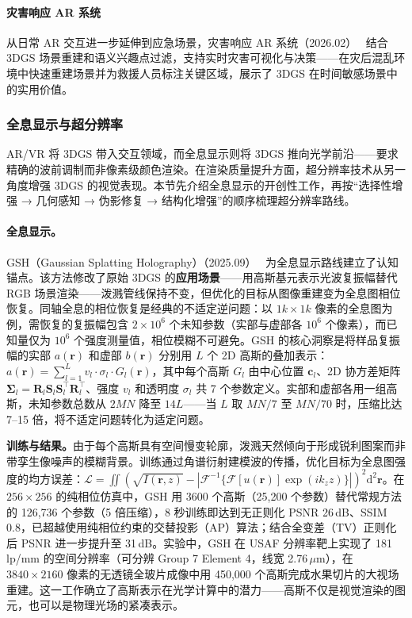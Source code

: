 \paragraph{灾害响应 AR 系统}
从日常 AR 交互进一步延伸到应急场景，灾害响应 AR 系统（2026.02）~\cite{2602_21874} 结合 3DGS 场景重建和语义兴趣点过滤，支持实时灾害可视化与决策——在灾后混乱环境中快速重建场景并为救援人员标注关键区域，展示了 3DGS 在时间敏感场景中的实用价值。

\subsubsection{全息显示与超分辨率}

AR/VR 将 3DGS 带入交互领域，而全息显示则将 3DGS 推向光学前沿——要求精确的波前调制而非像素级颜色渲染。在渲染质量提升方面，超分辨率技术从另一角度增强 3DGS 的视觉表现。本节先介绍全息显示的开创性工作，再按“选择性增强 → 几何感知 → 伪影修复 → 结构化增强”的顺序梳理超分辨率路线。

\paragraph{全息显示。}

GSH（Gaussian Splatting Holography）（2025.09）~\cite{2509_20774} 为全息显示路线建立了认知锚点。该方法修改了原始 3DGS 的\textbf{应用场景}——用高斯基元表示光波复振幅替代 RGB 场景渲染——泼溅管线保持不变，但优化的目标从图像重建变为全息图相位恢复。同轴全息的相位恢复是经典的不适定逆问题：以 $1k \times 1k$ 像素的全息图为例，需恢复的复振幅包含 $2 \times 10^6$ 个未知参数（实部与虚部各 $10^6$ 个像素），而已知量仅为 $10^6$ 个强度测量值，相位模糊不可避免。GSH 的核心洞察是将样品复振幅的实部 $a(\mathbf{r})$ 和虚部 $b(\mathbf{r})$ 分别用 $L$ 个 2D 高斯的叠加表示：$a(\mathbf{r}) = \sum_{l=1}^{L} v_l \cdot \sigma_l \cdot G_l(\mathbf{r})$，其中每个高斯 $G_l$ 由中心位置 $\mathbf{c}_l$、2D 协方差矩阵 $\bm{\Sigma}_l = \mathbf{R}_l \mathbf{S}_l \mathbf{S}_l^\top \mathbf{R}_l^\top$、强度 $v_l$ 和透明度 $\sigma_l$ 共 7 个参数定义。实部和虚部各用一组高斯，未知参数总数从 $2MN$ 降至 $14L$——当 $L$ 取 $MN/7$ 至 $MN/70$ 时，压缩比达 7--15 倍，将不适定问题转化为适定问题。

\textbf{训练与结果。}由于每个高斯具有空间慢变轮廓，泼溅天然倾向于形成锐利图案而非带孪生像噪声的模糊背景。训练通过角谱衍射建模波的传播，优化目标为全息图强度的均方误差：$\mathcal{L} = \iint (\sqrt{I(\mathbf{r},z)} - |\mathcal{F}^{-1}\{\mathcal{F}[u(\mathbf{r})] \exp(ik_z z)\}|)^2 \mathrm{d}^2\mathbf{r}$。在 $256 \times 256$ 的纯相位仿真中，GSH 用 3600 个高斯（25,200 个参数）替代常规方法的 126,736 个参数（5 倍压缩），8 秒训练即达到无正则化 PSNR 26\,dB、SSIM 0.8，已超越使用纯相位约束的交替投影（AP）算法；结合全变差（TV）正则化后 PSNR 进一步提升至 31\,dB。实验中，GSH 在 USAF 分辨率靶上实现了 181\,lp/mm 的空间分辨率（可分辨 Group 7 Element 4，线宽 2.76\,$\mu$m），在 $3840 \times 2160$ 像素的无透镜全玻片成像中用 450,000 个高斯完成水果切片的大视场重建。这一工作确立了高斯表示在光学计算中的潜力——高斯不仅是视觉渲染的图元，也可以是物理光场的紧凑表示。

